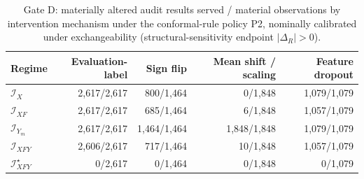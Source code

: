 \begin{table}[!tbp]
\caption{Gate D: materially altered audit results served / material observations by intervention mechanism under the conformal-rule policy P2, nominally calibrated under exchangeability (structural-sensitivity endpoint $|\Delta_R|>0$).}
\label{tab:s-policy-family}
\centering
\scriptsize
\setlength{\tabcolsep}{3pt}
\begin{tabular}{@{}lrrrr@{}}
\toprule
Regime & Evaluation-label & Sign flip & Mean shift / scaling & Feature dropout \\
\midrule
$\mathcal I_X$ & 2,617/2,617 & 800/1,464 & 0/1,848 & 1,079/1,079 \\
$\mathcal I_{XF}$ & 2,617/2,617 & 685/1,464 & 6/1,848 & 1,057/1,079 \\
$\mathcal I_{Y_m}$ & 2,617/2,617 & 1,464/1,464 & 1,848/1,848 & 1,079/1,079 \\
$\mathcal I_{XFY}$ & 2,606/2,617 & 717/1,464 & 10/1,848 & 1,057/1,079 \\
$\mathcal I_{XFY}^{\star}$ & 0/2,617 & 0/1,464 & 0/1,848 & 0/1,079 \\
\bottomrule
\end{tabular}
\end{table}
